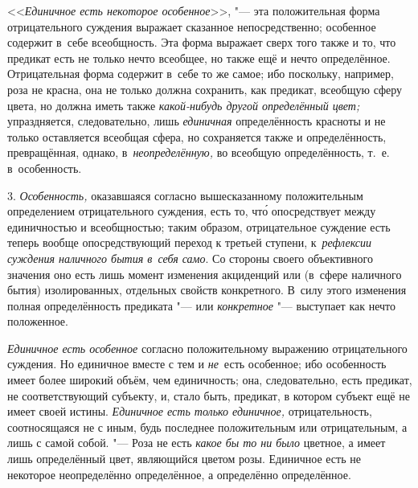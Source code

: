 <<{\em Единичное есть некоторое особенное}>>, "--- эта положительная форма
отрицательного суждения выражает сказанное непосредственно; особенное содержит
в~себе всеобщность. Эта форма выражает сверх того также и то, что предикат есть
не только нечто всеобщее, но также ещё и нечто определённое. Отрицательная
форма содержит в~себе то же самое; ибо поскольку, например, роза не красна, она
не только должна сохранить, как предикат, всеобщую сферу цвета, но должна иметь
также {\em какой-нибудь другой определённый цвет;} упраздняется, следовательно,
лишь {\em единичная} определённость красноты и не только оставляется всеобщая
сфера, но сохраняется также и определённость, превращённая, однако,
в~{\em неопределённую,} во всеобщую определённость, т.~е. в~особенность.

3. {\em Особенность,} оказавшаяся согласно вышесказанному положительным
определением отрицательного суждения, есть то, чт\'{о} опосредствует между
единичностью и всеобщностью; таким образом, отрицательное суждение есть теперь
вообще опосредствующий переход к третьей ступени, к~{\em рефлексии суждения
наличного бытия в~себя само}. Со стороны своего объективного значения оно есть
лишь момент изменения акциденций или (в~сфере наличного бытия) изолированных,
отдельных свойств конкретного. В~силу этого изменения полная определённость
предиката "--- или {\em конкретное} "--- выступает как нечто положенное.

{\em Единичное есть особенное} согласно положительному выражению
отрицательного суждения. Но единичное вместе с тем и
{\em не}~есть особенное; ибо особенность имеет более широкий объём,
чем единичность; она, следовательно, есть предикат, не соответствующий
субъекту, и, стало быть, предикат, в котором субъект ещё не имеет своей
истины. {\em Единичное есть только единичное,} отрицательность, соотносящаяся
не с иным, будь последнее положительным или отрицательным, а лишь с самой
собой. "--- Роза не есть {\em какое бы то ни было} цветное, а имеет лишь
определённый цвет, являющийся цветом розы. Единичное есть не некоторое
неопределённо определённое, а определённо определённое.

